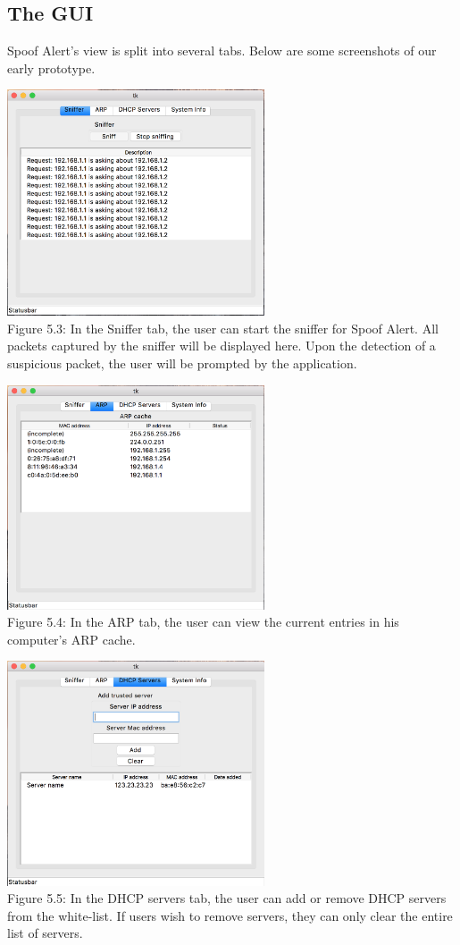 \documentclass{acm_proc_article-sp}
\begin{document}
\subsection{The GUI}

Spoof Alert's view is split into several tabs. Below are some screenshots of our early prototype.

\includegraphics[width=3in]{architecture03.png} \\
Figure 5.3: In the Sniffer tab, the user can start the sniffer for Spoof Alert. All packets captured by the sniffer will be displayed here. Upon the detection of a suspicious packet, the user will be prompted by the application.

\includegraphics[width=3in]{architecture04.png} \\
Figure 5.4: In the ARP tab, the user can view the current entries in his computer’s ARP cache.

\includegraphics[width=3in]{architecture05.png} \\
Figure 5.5: In the DHCP servers tab, the user can add or remove DHCP servers from the white-list. If users wish to remove servers, they can only clear the entire list of servers. 
\end{document}
